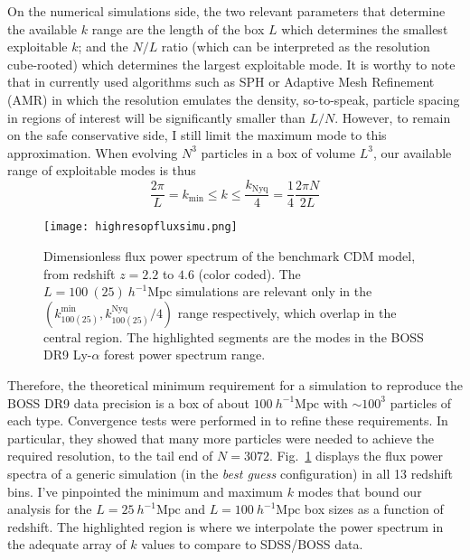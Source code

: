 On the numerical simulations side, the two relevant parameters that determine the available $k$ range are the length of the box $L$ which determines the smallest exploitable $k$; and the $N/L$ ratio (which can be interpreted as the resolution cube-rooted) which determines the largest exploitable mode. It is worthy to note that in currently used algorithms such as SPH or Adaptive Mesh Refinement (AMR) in which the resolution emulates the density, so-to-speak, particle spacing in regions of interest will be significantly smaller
than $L/N$. However, to remain on the safe conservative side, I still limit the maximum mode to this approximation. When evolving $N^3$ particles in a box of volume $L^3$, our available range of exploitable modes is thus
\begin{equation}
\frac{2 \pi}{L} = k_{\mathrm{min}} \leqslant k \leqslant \frac{k_{\mathrm{Nyq}}}{4} = \frac{1}{4} \frac{2 \pi N}{2 L}
\end{equation}

\begin{figure}
\begin{center}
\texttt{[image: highresopfluxsimu.png]}
\caption{Dimensionless flux power spectrum of the benchmark CDM model, from redshift $z=2.2$ to $4.6$ (color coded). The $L=100 ~(25) ~h^{-1}\mathrm{Mpc}$ simulations are relevant only in the $ \left( k^{\mathrm{min}}_{100 (25)}, k^{\mathrm{Nyq}}_{100 (25)} / 4 \right)$ range respectively, which overlap in the central region. The highlighted segments are the modes in the BOSS DR9 Ly-$\alpha$ forest power spectrum range.}
\label{fig:hrpsimu}
\end{center}
\end{figure}

Therefore, the theoretical minimum requirement for a simulation to reproduce the BOSS DR9 data precision is a box of about $100~h^{-1} \mathrm{Mpc}$ with $\sim 100^3$ particles of each type. Convergence tests were performed in \cite{Borde2014} to refine these requirements. In particular, they showed that many more particles were needed to achieve the required resolution, to the tail end of $N=3072$.
Fig.~\ref{fig:hrpsimu} displays the flux power spectra of a generic simulation (in the \emph{best guess} configuration) in all 13 redshift bins. I've pinpointed the minimum and maximum $k$ modes that bound our analysis for the $L=25~h^{-1}\mathrm{Mpc}$ and $L=100~h^{-1}\mathrm{Mpc}$ box sizes as a function of redshift. The highlighted region is where we interpolate the power spectrum in the adequate array of $k$ values to compare to SDSS/BOSS data.

